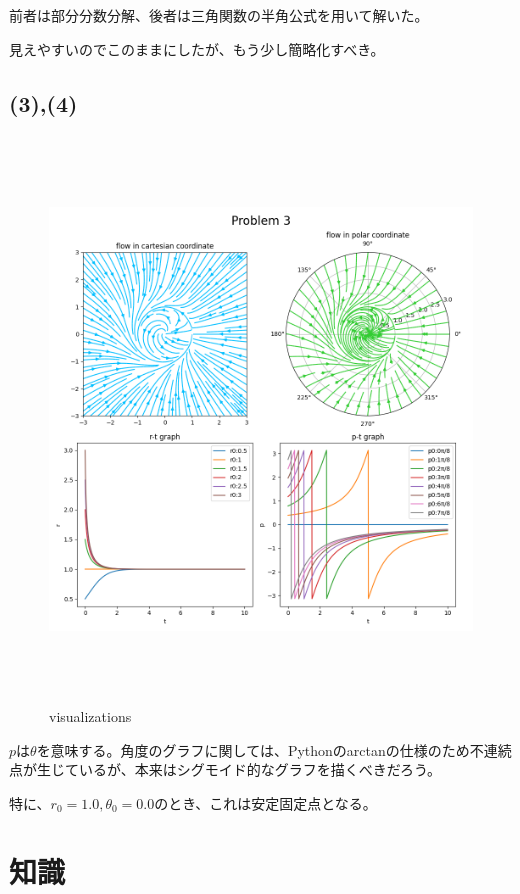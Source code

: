 \documentclass[a4paper, 10pt, dvipdfmx]{jlreq}
\begin{document}
前者は部分分数分解、後者は三角関数の半角公式を用いて解いた。

見えやすいのでこのままにしたが、もう少し簡略化すべき。

\subsection*{(3),(4)}

\begin{figure}[htbp]
  \begin{center}
    \includegraphics[height=150mm]{3.png}
    \caption{visualizations}
    \label{img:vis}
  \end{center}
\end{figure}

$p$は$\theta$を意味する。角度のグラフに関しては、Pythonのarctanの仕様のため不連続点が生じているが、本来はシグモイド的なグラフを描くべきだろう。

特に、$r_0=1.0, \theta_0=0.0$のとき、これは安定固定点となる。

\section{知識}
\end{document}
